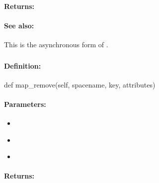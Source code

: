\paragraph{Returns:}


\paragraph{See also:}  This is the asynchronous form of .

\pagebreak
\subsubsection{}
\label{api:python:map_remove}


\paragraph{Definition:}
\begin{pythoncode}
def map_remove(self, spacename, key, attributes)
\end{pythoncode}

\paragraph{Parameters:}
\begin{itemize}[noitemsep]
\item {}\\

\item {}\\

\item {}\\

\end{itemize}

\paragraph{Returns:}


\pagebreak
\subsubsection{}
\label{api:python:async_map_remove}


